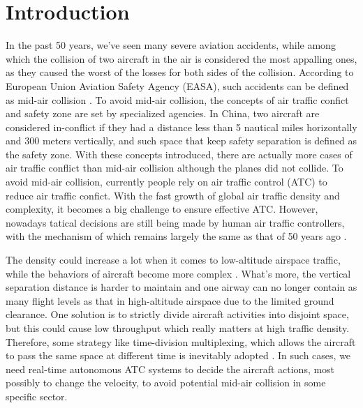 \section{Introduction}
In the past 50 years, we've seen many severe aviation accidents, while among which the collision of two aircraft in the air is considered the most appalling ones, as they caused the worst of the losses for both sides of the collision. According to European Union Aviation Safety Agency (EASA), such accidents can be defined as mid-air collision \citep{de2011use}. To avoid mid-air collision, the concepts of air traffic confict and safety zone are set by specialized agencies. In China, two aircraft are considered in-conflict if they had a distance less than 5 nautical miles horizontally and 300 meters vertically, and such space that keep safety separation is defined as the safety zone. With these concepts introduced, there are actually more cases of air traffic conflict than mid-air collision although the planes did not collide. To avoid mid-air collision, currently people rely on air traffic control (ATC) to reduce air traffic confict. With the fast growth of global air traffic density and complexity, it becomes a big challenge to ensure effective ATC. However, nowadays tatical decisions are still being made by human air traffic controllers, with the mechanism of which remains largely the same as that of 50 years ago \citep{national2014autonomy}.

The density could increase a lot when it comes to low-altitude airspace traffic, while the behaviors of aircraft become more complex \citep{kopardekar2015safely}. What's more, the vertical separation distance is harder to maintain and one airway can no longer contain as many flight levels as that in high-altitude airspace due to the limited ground clearance. One solution is to strictly divide aircraft activities into disjoint space, but this could cause low throughput which really matters at high traffic density. Therefore, some strategy like time-division multiplexing, which allows the aircraft to pass the same space at different time is inevitably adopted \citep{mueller2017enabling}. In such cases, we need real-time autonomous ATC systems to decide the aircraft actions, most possibly to change the velocity, to avoid potential mid-air collision in some specific sector.

